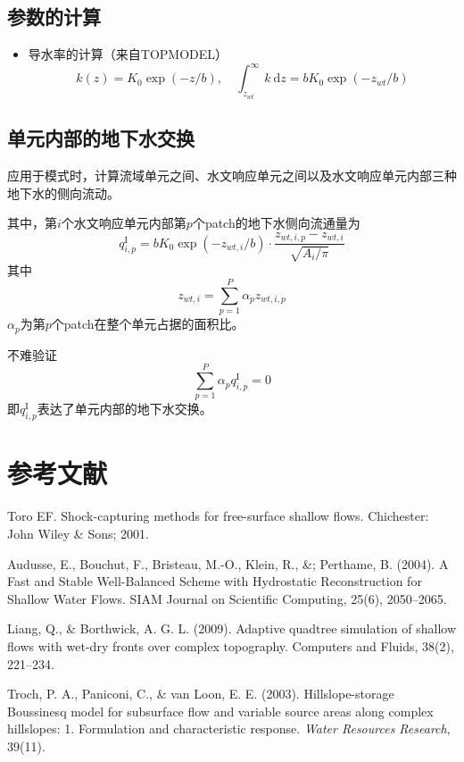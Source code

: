 \subsection{参数的计算}
\begin{itemize}
\item 导水率的计算（来自TOPMODEL）
\begin{equation}
k(z) = K_0\exp{(- z/b)},\quad \int^\infty_{z_{wt}} k\ \mathrm{d}z = b K_0\exp{(-z_{wt}/b)}
\end{equation}
\end{itemize}


\subsection{单元内部的地下水交换}
应用于模式时，计算流域单元之间、水文响应单元之间以及水文响应单元内部三种地下水的侧向流动。

其中，第$i$个水文响应单元内部第$p$个patch的地下水侧向流通量为
\begin{equation}
q^{\mathrm{I}}_{i,p} = b K_0 \exp{(-z_{wt,i}/b)}\cdot\frac{z_{wt,i,p}-z_{wt,i}}{\sqrt{A_i/\pi}}
\end{equation}
其中
$$z_{wt,i} = \sum^P_{p=1} \alpha_p z_{wt,i,p}$$
$\alpha_p$为第$p$个patch在整个单元占据的面积比。

不难验证
$$\sum^P_{p=1} \alpha_p q^{\mathrm{I}}_{i,p} =0$$
即$q^{\mathrm{I}}_{i,p}$表达了单元内部的地下水交换。


\section{参考文献}
Toro EF. Shock-capturing methods for free-surface shallow flows. Chichester: John Wiley \& Sons; 2001.

Audusse, E., Bouchut, F., Bristeau, M.-O., Klein, R., \&; Perthame, B. (2004). A Fast and Stable Well-Balanced Scheme with Hydrostatic Reconstruction for Shallow Water Flows. SIAM Journal on Scientific Computing, 25(6), 2050–2065.

Liang, Q., \& Borthwick, A. G. L. (2009). Adaptive quadtree simulation of shallow flows with wet-dry fronts over complex topography. Computers and Fluids, 38(2), 221–234.

Troch, P. A., Paniconi, C., \& van Loon, E. E. (2003). Hillslope-storage Boussinesq model for subsurface flow and variable source areas along complex hillslopes: 1. Formulation and characteristic response. \textit{Water Resources Research}, 39(11).

